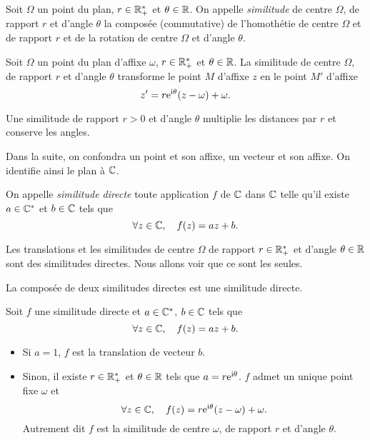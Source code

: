 \documentclass{magnolia}
\begin{document}
\begin{definition}[utile=-3]
Soit $\Omega$ un point du plan, $r\in\mathbb{R}_+^*$ et $\theta\in\mathbb{R}$. On appelle \emph{similitude} de centre $\Omega$, de rapport $r$ et d'angle $\theta$ la composée (commutative) de l'homothétie de centre $\Omega$ et de rapport $r$ et de la rotation de centre $\Omega$ et d'angle $\theta$.
\end{definition}

\begin{proposition}[utile=-3]
Soit $\Omega$ un point du plan d'affixe $\omega$, $r\in\mathbb{R}_+^*$ et $\theta\in\mathbb{R}$. La similitude de centre $\Omega$, de rapport $r$ et d'angle $\theta$ transforme le point $M$ d'affixe $z$ en le point $M'$ d'affixe
\[z'=r{\rm e}^{{\rm i}\theta}(z-\omega)+\omega.\]
\end{proposition}

\begin{remarqueUnique}
\remarque Une similitude de rapport $r>0$ et d'angle $\theta$ multiplie les distances par
  $r$ et conserve les angles.
\end{remarqueUnique}

Dans la suite, on confondra un point et son affixe, un vecteur et son affixe. On identifie ainsi le plan à $\mathbb{C}$.

\begin{definition}
On appelle \emph{similitude directe} toute application $f$ de $\mathbb{C}$ dans $\mathbb{C}$ telle qu'il existe $a\in\mathbb{C}^*$ et $b\in\mathbb{C}$ tels que
\[\forall z\in\mathbb{C},\quad f(z)=az+b.\]
\end{definition}

\begin{remarqueUnique}
\remarque Les translations et les similitudes de centre $\Omega$ de rapport $r\in\mathbb{R}_+^*$ et d'angle $\theta\in\mathbb{R}$ sont des similitudes directes. Nous allons voir que ce sont les seules.
\end{remarqueUnique}

\begin{proposition}
La composée de deux similitudes directes est une similitude directe.
\end{proposition}

\begin{proposition}
Soit $f$ une similitude directe et $a\in\mathbb{C}^*$, $b\in\mathbb{C}$ tels que
\[\forall z\in\mathbb{C},\quad f(z)=az+b.\]
\begin{itemize}
\item Si $a=1$, $f$ est la translation de vecteur $b$.
\item Sinon, il existe $r\in\mathbb{R}_+^*$ et $\theta\in\mathbb{R}$ tels que $a=r{\rm e}^{{\rm i}\theta}$. $f$ admet un unique point fixe $\omega$ et
\[\forall z\in\mathbb{C},\quad f(z)=r{\rm e}^{{\rm i}\theta}(z-\omega)+\omega.\]
Autrement dit $f$ est la similitude de centre $\omega$, de rapport $r$ et d'angle $\theta$.
\end{itemize}
\end{proposition}
\end{document}

